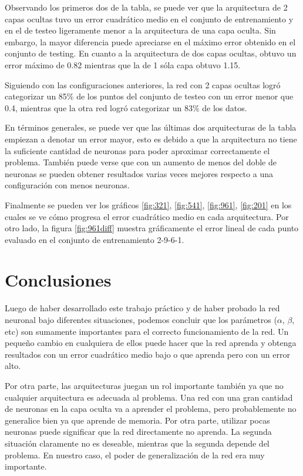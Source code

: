 \documentclass[11pt]{article}
\begin{document}
    \par Observando los primeros dos de la tabla, se puede ver que la arquitectura de 2 capas ocultas tuvo un error cuadrático medio en el conjunto de entrenamiento y en el de testeo ligeramente menor a la arquitectura de una capa oculta. Sin embargo, la mayor diferencia puede apreciarse en el máximo error obtenido en el conjunto de testing. En cuanto a la arquitectura de dos capas ocultas, obtuvo un error máximo de 0.82 mientras que la de 1 sóla capa obtuvo 1.15.
    \par Siguiendo con las configuraciones anteriores, la red con 2 capas ocultas logró categorizar un 85\% de los puntos del conjunto de testeo con un error menor que 0.4, mientras que la otra red logró categorizar un 83\% de los datos.
    \par En términos generales, se puede ver que las últimas dos arquitecturas de la tabla empiezan a denotar un error mayor, esto es debido a que la arquitectura no tiene la suficiente cantidad de neuronas para poder aproximar correctamente el problema. También puede verse que con un aumento de menos del doble de neuronas se pueden obtener resultados varias veces mejores respecto a una configuración con menos neuronas.
    \par Finalmente se pueden ver los gráficos \ref{fig:321}, \ref{fig:541}, \ref{fig:961}, \ref{fig:201} en los cuales se ve cómo progresa el error cuadrático medio en cada arquitectura. Por otro lado, la figura \ref{fig:961diff} muestra gráficamente el error lineal de cada punto evaluado en el conjunto de entrenamiento 2-9-6-1.
    \section{Conclusiones}
    \par Luego de haber desarrollado este trabajo práctico y de haber probado la red neuronal bajo diferentes situaciones, podemos concluir que los parámetros (\begin{math}\alpha\end{math}, \begin{math}\beta\end{math}, etc) son sumamente importantes para el correcto funcionamiento de la red. Un pequeño cambio en cualquiera de ellos puede hacer que la red aprenda y obtenga resultados con un error cuadrático medio bajo o que aprenda pero con un error alto.
    \par Por otra parte, las arquitecturas juegan un rol importante también ya que no cualquier arquitectura es adecuada al problema. Una red con una gran cantidad de neuronas en la capa oculta va a aprender el problema, pero probablemente no generalice bien ya que aprende de memoria. Por otra parte, utilizar pocas neuronas puede significar que la red directamente no aprenda. La segunda situación claramente no es deseable, mientras que la segunda depende del problema. En nuestro caso, el poder de generalización de la red era muy importante.
      
\clearpage
\onecolumn
\appendix
\end{document}
